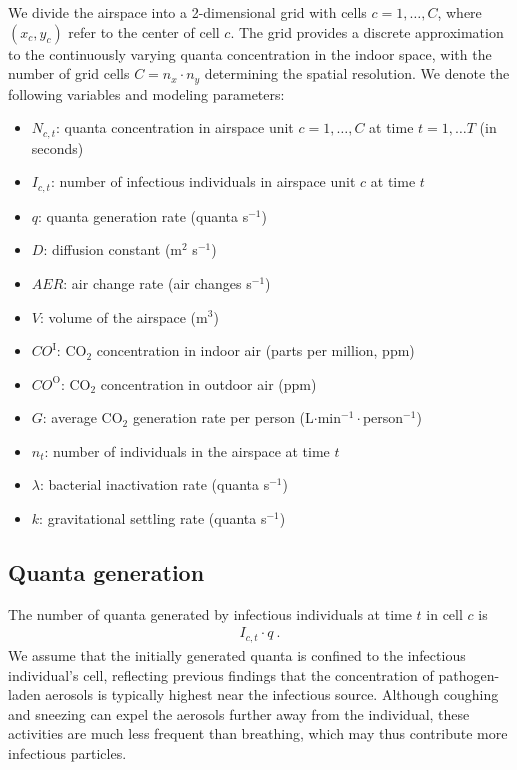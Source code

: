 \documentclass[fleqn,11pt]{wlscirep_supp}
\begin{document}
We divide the airspace into a 2-dimensional grid with cells $c = 1, \dots, C$, where $(x_c, y_c)$ refer to the center of cell $c$. The grid provides a discrete approximation to the continuously varying quanta concentration in the indoor space, with the number of grid cells $C = n_x \cdot n_y$ determining the spatial resolution. We denote the following variables and modeling parameters:
\begin{itemize}
    \item $N_{c,t}$: quanta concentration in airspace unit $c = 1, \dots, C$ at time $t = 1, \dots T$ (in seconds)
    \item $I_{c,t}$: number of infectious individuals in airspace unit $c$ at time $t$
    \item $q$: quanta generation rate (quanta s$^{-1}$)
    \item $D$: diffusion constant (m$^2$ s$^{-1}$)
    \item $AER$: air change rate (air changes s$^{-1}$)
    \item $V$: volume of the airspace (m$^3$)
    \item $CO^{\text{I}}$: CO$_2$ concentration in indoor air (parts per million, ppm)
    \item $CO^{\text{O}}$: CO$_2$ concentration in outdoor air (ppm)
    \item $G$: average CO$_2$ generation rate per person (L$\cdot$min$^{-1}\cdot$person$^{-1}$)
    \item $n_t$: number of individuals in the airspace at time $t$
    \item $\lambda$: bacterial inactivation rate (quanta s$^{-1}$)
    \item $k$: gravitational settling rate (quanta s$^{-1}$)
\end{itemize}

\subsection{Quanta generation}\label{sec:quanta-generation}

The number of quanta generated by infectious individuals at time $t$ in cell $c$ is 
\begin{align}\label{eq:generation}
    I_{c,t} \cdot q ~.
\end{align}
We assume that the initially generated quanta is confined to the infectious individual's cell, reflecting previous findings that the concentration of pathogen-laden aerosols is typically highest near the infectious source\cite{Wang2021Science,Morawska2021,Vuorinen2020SafSci,Chen2020BuildEnv}. Although coughing and sneezing can expel the aerosols further away from the individual, these activities are much less frequent than breathing, which may thus contribute more infectious particles\cite{Dinkele2022AJRCCM}. 
\end{document}
